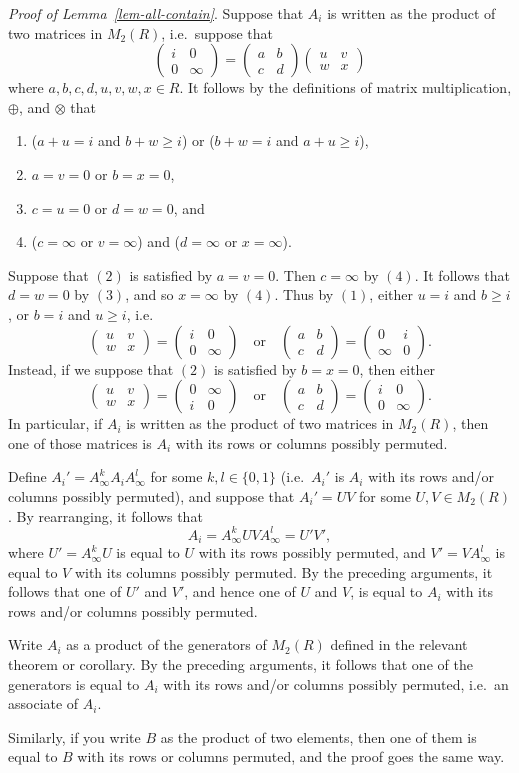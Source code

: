 \documentclass{article}
\newcommand{\mat}[4]{\begin{pmatrix}#1&#2\\#3&#4\end{pmatrix}}
\theoremstyle{definition}
\begin{document}
\textit{Proof of Lemma~\ref{lem-all-contain}}.
Suppose that $A_{i}$ is written as the product of two matrices in $M_{2}(R)$,
i.e.\ suppose that
$$\mat{i}{0}{0}{\infty} = \mat{a}{b}{c}{d} \mat{u}{v}{w}{x}$$
where $a,b,c,d,u,v,w,x \in R$. It follows by the definitions
of matrix multiplication, $\oplus$, and $\otimes$ that
\begin{enumerate}
  \item
    ($a + u = i$ and $b + w \geq i$) or ($b + w = i$ and $a + u \geq i$),
  \item
    $a = v = 0$ or $b = x = 0$,
  \item
    $c = u = 0$ or $d = w = 0$, and
  \item
    ($c = \infty$ or $v = \infty$) and ($d = \infty$ or $x = \infty$).
\end{enumerate}
Suppose that $(2)$ is satisfied by $a = v = 0$. Then $c = \infty$ by $(4)$.  It
follows that $d = w = 0$ by $(3)$, and so $x = \infty$ by $(4)$.  Thus by $(1)$,
either $u = i$ and $b \geq i$, or $b = i$ and $u \geq i$, i.e.\
$$\mat{u}{v}{w}{x} = \mat{i}{0}{0}{\infty} \quad \text{or} \quad
\mat{a}{b}{c}{d} = \mat{0}{i}{\infty}{0}.$$
Instead, if we suppose that $(2)$ is satisfied by $b = x = 0$, then either
$$\mat{u}{v}{w}{x} = \mat{0}{\infty}{i}{0} \quad \text{or} \quad
\mat{a}{b}{c}{d} = \mat{i}{0}{0}{\infty}.$$
In particular, if $A_{i}$ is written as the product of two matrices in
$M_{2}(R)$, then one of those matrices is $A_{i}$ with its rows or columns
possibly permuted.

Define $A_{i}' = A_{\infty}^{k} A_{i} A_{\infty}^{l}$ for some $k, l \in \{0,
1\}$ (i.e.\ $A_{i}'$ is $A_{i}$ with its rows and/or columns possibly permuted),
and suppose that $A_{i}' = UV$ for some $U, V \in M_{2}(R)$. By rearranging, it
follows that
$$A_{i} = A_{\infty}^{k} U V A_{\infty}^{l} = U' V',$$
where $U' = A_{\infty}^{k} U$ is equal to $U$ with its rows possibly permuted,
and $V' = V A_{\infty}^{l}$ is equal to $V$ with its columns possibly permuted.
By the preceding arguments, it follows that one of $U'$ and $V'$,
and hence one of $U$ and $V$, is equal to $A_{i}$ with its rows and/or columns
possibly permuted.

Write $A_{i}$ as a product of the generators of $M_{2}(R)$ defined in the
relevant theorem or corollary. By the preceding arguments, it follows that
one of the generators is equal to $A_{i}$ with its rows and/or columns possibly
permuted, i.e.\ an associate of $A_{i}$.

Similarly, if you write $B$ as the product of two elements, then one of them is
equal to $B$ with its rows or columns permuted, and the proof goes the same way.
\end{document}
